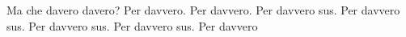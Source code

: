 \documentclass{article}
\begin{document}
Ma che davero davero?
Per davvero.
Per davvero.
Per davvero sus.
Per davvero sus.
Per davvero sus.
Per davvero sus.
Per davvero
\end{document}
